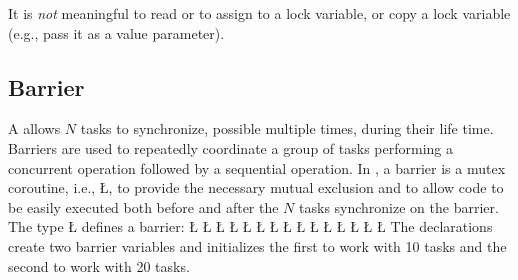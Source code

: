 \documentclass[openright,twoside]{report}
\begin{document}
It is \emph{not} meaningful to read or to assign to a lock variable, or copy a lock variable (e.g., pass it as a value parameter).


\subsection{Barrier}

A  allows $N$ tasks to synchronize, possible multiple times, during their life time.
Barriers are used to repeatedly coordinate a group of tasks performing a concurrent operation followed by a sequential operation.
In \uC, a barrier is a mutex coroutine, i.e., \LGinlinetrue\LGbegin\lgrinde\L{}\endlgrinde\LGend{}, to provide the necessary mutual exclusion and to allow code to be easily executed both before and after the $N$ tasks synchronize on the barrier.
The type \LGinlinetrue\LGbegin\lgrinde\L{}\endlgrinde\LGend{} defines a barrier:
\LGinlinefalse\LGbegin\lgrinde
\L{}
\L{}
\L{\LB{}}
\L{\LB{}}
\L{\LB{}}
\L{\LB{}}
\L{}
\L{\LB{}}
\L{\LB{}}
\L{\LB{}}
\L{\LB{}}
\L{\LB{}}
\L{\LB{\};}}
\L{}
\L{}
\endlgrinde\LGend
{}%
%
%
%
%
The declarations create two barrier variables and initializes the first to work with 10 tasks and the second to work with 20 tasks.
\end{document}
